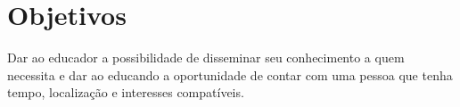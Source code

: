 \chapter[Objetivos]{Objetivos}



Dar ao educador a possibilidade de disseminar seu conhecimento a quem necessita e dar ao educando a oportunidade de contar com uma pessoa que tenha tempo, localização e interesses compatíveis.


